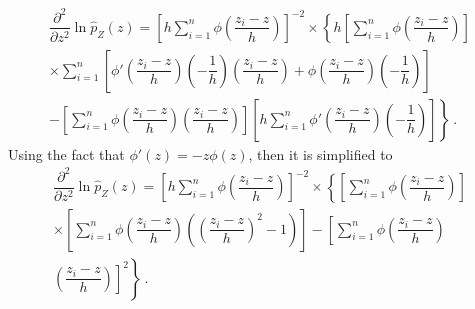 \begin{multline}
  \dfrac{
    \partial^2
  }
  {
    \partial z^2
  }
  \ln\widehat{p}_Z(z)
  =
  \left[
    h\sum_{i=1}^n
    \phi\left(
      \dfrac{
        z_i-z
      }
      {
        h
      }
    \right)
  \right]^{-2}
  \times
  \left\{
    h\left[
      \sum_{i=1}^n
      \phi\left(
        \dfrac{
          z_i-z
        }
        {
          h
        }
      \right)
    \right]
  \right.
  \\
  \left.
    \times
    \sum_{i=1}^n\left[
      \phi'\left(
        \dfrac{
          z_i-z
        }
        {
          h
        }
      \right)
      \left(
        -\dfrac{
          1
        }
        {
          h
        }
      \right)
      \left(
        \dfrac{
          z_i-z
        }
        {
          h
        }
      \right)
      +\phi\left(
        \dfrac{
          z_i-z
        }
        {
          h
        }
      \right)
      \left(
        -\dfrac{
          1
        }
        {
          h
        }
      \right)
    \right]
  \right.
  \\
  \left.
    -
    \left[
      \sum_{i=1}^n
      \phi\left(
        \dfrac{
          z_i-z
        }
        {
          h
        }
      \right)
      \left(
        \dfrac{
          z_i-z
        }
        {
          h
        }
      \right)
    \right]
    \left[
      h\sum_{i=1}^n
      \phi'\left(
        \dfrac{
          z_i-z
        }
        {
          h
        }
      \right)
      \left(
        -\dfrac{
          1
        }
        {
          h
        }
      \right)
    \right]
  \right\}
  \ .
\end{multline}
Using the fact that $\phi'(z)=-z\phi(z)$, then it is simplified to
\begin{multline}
  \dfrac{
    \partial^2
  }
  {
    \partial z^2
  }
  \ln\widehat{p}_Z(z)
  =
  \left[
    h\sum_{i=1}^n
    \phi\left(
      \dfrac{
        z_i-z
      }
      {
        h
      }
    \right)
  \right]^{-2}
  \times
  \left\{
    \left[
      \sum_{i=1}^n
      \phi\left(
        \dfrac{
          z_i-z
        }
        {
          h
        }
      \right)
    \right]
  \right.
  \\
  \left.
    \times
    \left[
      \sum_{i=1}^n
      \phi\left(
        \dfrac{
          z_i-z
        }
        {
          h
        }
      \right)
      \left(
        \left(
          \dfrac{
            z_i-z
          }
          {
            h
          }
        \right)^2
        -1
      \right)
    \right]
    -
    \left[
      \sum_{i=1}^n
      \phi\left(
        \dfrac{
          z_i-z
        }
        {
          h
        }
      \right)
    \right.
  \right.
  \\
  \left.
    \left.
      \left(
        \dfrac{
          z_i-z
        }
        {
          h
        }
      \right)
    \right]^2
  \right\}
  \ .
\end{multline}

